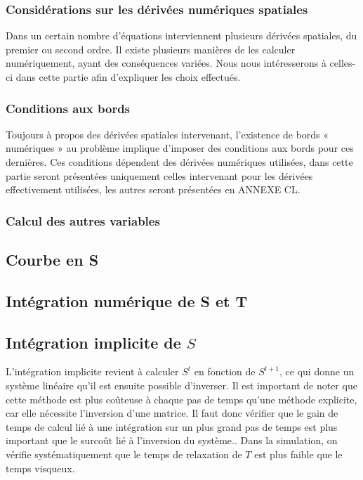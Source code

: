 \subsubsection{Considérations sur les dérivées numériques spatiales}

Dans un certain nombre d’équations interviennent plusieurs dérivées spatiales,
du premier ou second ordre. Il existe plusieurs manières de les calculer
numériquement, ayant des conséquences variées. Nous nous intéresserons à
celles-ci dans cette partie afin d’expliquer les choix effectués.

\subsubsection{Conditions aux bords}

Toujours à propos des dérivées spatiales intervenant, l’existence de bords «
numériques » au problème implique d’imposer des conditions aux bords pour ces
dernières. Ces conditions dépendent des dérivées numériques utilisées, dans
cette partie seront présentées uniquement celles intervenant pour les dérivées
effectivement utilisées, les autres seront présentées en ANNEXE CL.

\subsubsection{Calcul des autres variables}

\subsection{Courbe en S}
%

\subsection{Intégration numérique de S et T}\subsection{Intégration implicite de $S$}
\label{ssec:integration_S_imp}
L'intégration implicite revient à calculer $S^t$ en fonction de $S^{t+1}$, ce qui donne un système linéaire qu'il est ensuite possible d'inverser. Il est important de noter que cette méthode est plus coûteuse à chaque pas de temps qu'une méthode explicite, car elle nécessite l'inversion d'une matrice. Il faut donc vérifier que le gain de temps de calcul lié à une intégration sur un plus grand pas de temps est plus important que le surcoût lié à l'inversion du système.. Dans la simulation, on vérifie systématiquement que le temps de relaxation de $T$ est plus faible que le temps visqueux.

